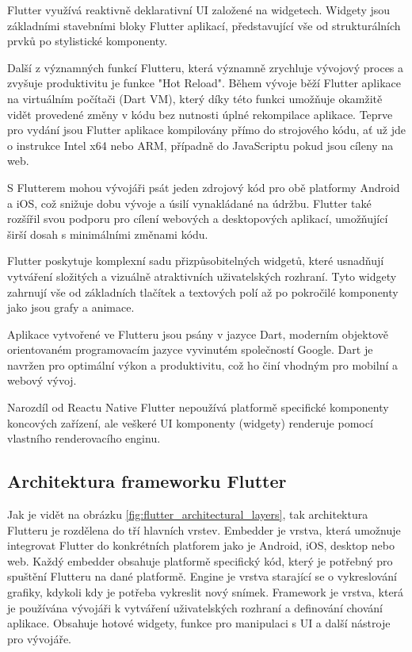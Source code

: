 Flutter využívá reaktivně deklarativní UI založené na widgetech. \cite{flutterUI} Widgety jsou základními stavebními 
bloky Flutter aplikací, představující vše od strukturálních prvků po stylistické komponenty. \cite{flutterWidgets}

Další z významných funkcí Flutteru, která významně zrychluje vývojový proces a zvyšuje produktivitu je funkce "Hot Reload". 
Během vývoje běží Flutter aplikace na virtuálním počítači (Dart VM), který díky této funkci umožňuje okamžitě vidět provedené změny
v kódu bez nutnosti úplné rekompilace aplikace. \cite{flutterHotReload} Teprve pro vydání jsou Flutter aplikace kompilovány přímo do strojového kódu, 
ať už jde o instrukce Intel x64 nebo ARM, případně do JavaScriptu pokud jsou cíleny na web. \cite{flutterArchOverview}


S Flutterem mohou vývojáři psát jeden zdrojový kód pro obě platformy Android a iOS, což snižuje dobu vývoje a úsilí 
vynakládané na údržbu. Flutter také rozšířil svou podporu pro cílení webových a desktopových aplikací, umožňující širší dosah s minimálními změnami kódu. \cite{flutter}

Flutter poskytuje komplexní sadu přizpůsobitelných widgetů, které usnadňují vytváření složitých a vizuálně 
atraktivních uživatelských rozhraní. Tyto widgety zahrnují vše od základních tlačítek a textových polí až po 
pokročilé komponenty jako jsou grafy a animace.

Aplikace vytvořené ve Flutteru jsou psány v jazyce Dart, moderním objektově orientovaném programovacím jazyce 
vyvinutém společností Google. Dart je navržen pro optimální výkon a produktivitu, což ho činí vhodným pro mobilní a
webový vývoj. \cite{dart}

Narozdíl od Reactu Native Flutter nepoužívá platformě specifické komponenty koncových zařízení, ale veškeré UI komponenty (widgety)
renderuje pomocí vlastního renderovacího enginu. \cite{flutterRenderingModel}


\subsection*{Architektura frameworku Flutter} 
Jak je vidět na obrázku \ref{fig:flutter_architectural_layers}, tak architektura Flutteru je rozdělena do tří hlavních vrstev. \cite{flutterArchOverview}
Embedder je vrstva, která umožnuje integrovat Flutter do konkrétních platforem jako je Android, iOS, desktop nebo web. 
Každý embedder obsahuje platformě specifický kód, který je potřebný pro spuštění Flutteru na dané platformě.
Engine je vrstva starající se o vykreslování grafiky, kdykoli kdy je potřeba vykreslit nový snímek. \cite{flutterArchOverview} 
Framework je vrstva, která je používána vývojáři k vytváření uživatelských rozhraní a definování chování aplikace. 
Obsahuje hotové widgety, funkce pro manipulaci s UI a další nástroje pro vývojáře. \cite{flutterArchOverview} 



